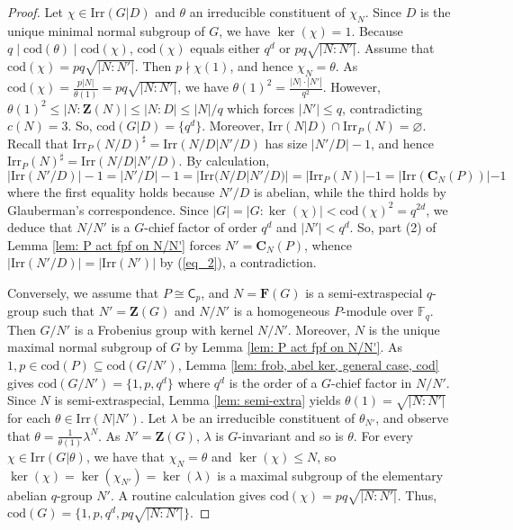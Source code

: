 \documentclass[9pt]{article}
\begin{document}
\begin{proof}
  Let $\chi \in \mathrm{Irr}(G|D)$ and $\theta$ an irreducible constituent of $\chi_N$.
   Since $D$ is the unique minimal normal subgroup of $G$,
   we have $\ker(\chi)=1$.
   Because $q\mid \mathrm{cod}(\theta)\mid \mathrm{cod}(\chi)$,
   $\mathrm{cod}(\chi)$ equals either $q^{d}$ or $pq \sqrt{|N:N'|}$.
  Assume that $\mathrm{cod}(\chi)=pq \sqrt{|N:N'|}$.
  Then $p\nmid \chi(1)$, and hence $\chi_N=\theta$.
  As $\mathrm{cod}(\chi)=\frac{p|N|}{\theta(1)}=pq \sqrt{|N:N'|}$,
   we have $\theta(1)^{2}=\frac{|N|\cdot |N'|}{q^{2}}$.
 However, $\theta(1)^{2}\leq |N:\mathbf{Z}(N)|\leq |N:D|\leq |N|/q$ which forces $|N'|\leq q$,
 contradicting $c(N)=3$.
  So, $\mathrm{cod}(G|D)=\{ q^{d} \}$.  
  Moreover, $\mathrm{Irr}(N|D)\cap \mathrm{Irr}_P(N)=\varnothing$.
  Recall that $\mathrm{Irr}_P(N/D)^\sharp=\mathrm{Irr}(N/D|N'/D)$ has size $|N'/D|-1$,
  and hence  $\mathrm{Irr}_P(N)^\sharp=\mathrm{Irr}(N/D|N'/D)$.
  By calculation,
  \begin{equation}\label{eq_2}
	|\mathrm{Irr}(N'/D)|-1=|N'/D|-1= |\mathrm{Irr}(N/D|N'/D)|=|\mathrm{Irr}_P(N)|-1=|\mathrm{Irr}(\mathbf{C}_{N}(P))|-1
\end{equation}
  where the first equality holds because $N'/D$ is abelian, while the third holds by Glauberman's correspondence.
  Since $|G|=|G:\ker(\chi)|<\mathrm{cod}(\chi)^{2}=q^{2d}$,
  we deduce that $N/N'$ is a $G$-chief factor of order $q^{d}$ and $|N'|<q^{d}$.
  So, part (2) of Lemma \ref{lem: P act fpf on N/N'} forces
   $N'=\mathbf{C}_{N}(P)$,
   whence $|\mathrm{Irr}(N'/D)|=|\mathrm{Irr}(N')|$ by (\ref{eq_2}), a contradiction.
  

  


   Conversely, we assume that $P\cong \mathsf{C}_{p}$, and $N=\mathbf{F}(G)$ is a semi-extraspecial $q$-group such that $N'=\mathbf{Z}(G)$ and $N/N'$ is a homogeneous $P$-module over $\mathbb{F}_q$.
   Then $G/N'$ is a Frobenius group with kernel $N/N'$.
   Moreover, $N$ is the unique maximal normal subgroup of $G$ by Lemma \ref{lem: P act fpf on N/N'}.
   As $1,p\in \mathrm{cod}(P)\subseteq \mathrm{cod}(G/N')$,
  Lemma \ref{lem: frob, abel ker, general case, cod} gives $\mathrm{cod}(G/N')=\{ 1,p,q^{d} \}$ where $q^{d}$ is the order of a $G$-chief factor in $N/N'$.
   Since $N$ is semi-extraspecial,
   Lemma \ref{lem: semi-extra} yields $\theta(1)=\sqrt{|N:N'|}$ for each $\theta\in \mathrm{Irr}(N|N')$.
   Let $\lambda$ be an irreducible constituent of $\theta_{N'}$, and observe that $\theta=\frac{1}{\theta(1)}\lambda^N$. 
   As $N'=\mathbf{Z}(G)$, $\lambda$ is $G$-invariant
   and so is $\theta$.
   For every $\chi\in \mathrm{Irr}(G|\theta)$,
   we have that $\chi_N=\theta$ and $\ker(\chi)\leq N$, so $\ker(\chi)=\ker(\chi_{N'})=\ker(\lambda)$ is a maximal subgroup of the elementary abelian $q$-group $N'$.
   A routine calculation gives $\mathrm{cod}(\chi)=pq\sqrt{|N:N'|}$.
   Thus, $\mathrm{cod}(G)=\{ 1,p,q^{d},pq\sqrt{|N:N'|} \}$.
\end{proof}
\end{document}

